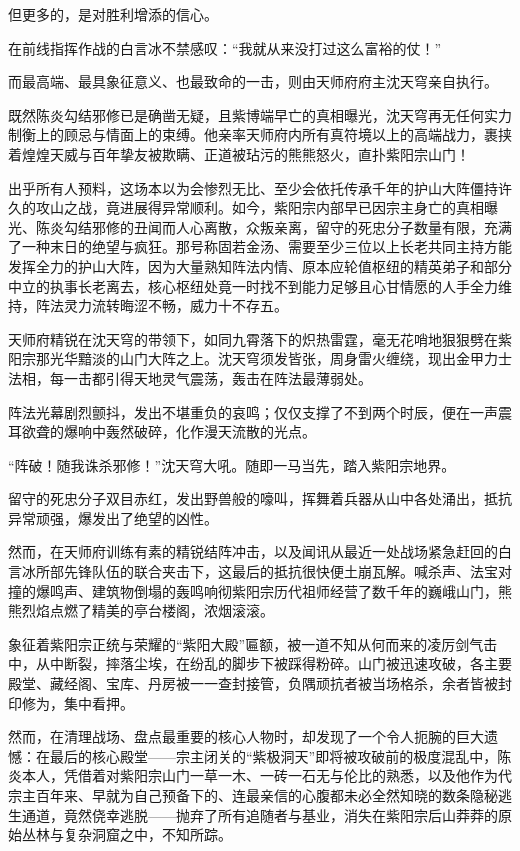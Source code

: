但更多的，是对胜利增添的信心。

在前线指挥作战的白言冰不禁感叹：“我就从来没打过这么富裕的仗！”

\vspace{2em}

而最高端、最具象征意义、也最致命的一击，则由天师府府主沈天穹亲自执行。

既然陈炎勾结邪修已是确凿无疑，且紫博端早亡的真相曝光，沈天穹再无任何实力制衡上的顾忌与情面上的束缚。他亲率天师府内所有真符境以上的高端战力，裹挟着煌煌天威与百年挚友被欺瞒、正道被玷污的熊熊怒火，直扑紫阳宗山门！

出乎所有人预料，这场本以为会惨烈无比、至少会依托传承千年的护山大阵僵持许久的攻山之战，竟进展得异常顺利。如今，紫阳宗内部早已因宗主身亡的真相曝光、陈炎勾结邪修的丑闻而人心离散，众叛亲离，留守的死忠分子数量有限，充满了一种末日的绝望与疯狂。那号称固若金汤、需要至少三位以上长老共同主持方能发挥全力的护山大阵，因为大量熟知阵法内情、原本应轮值枢纽的精英弟子和部分中立的执事长老离去，核心枢纽处竟一时找不到能力足够且心甘情愿的人手全力维持，阵法灵力流转晦涩不畅，威力十不存五。

天师府精锐在沈天穹的带领下，如同九霄落下的炽热雷霆，毫无花哨地狠狠劈在紫阳宗那光华黯淡的山门大阵之上。沈天穹须发皆张，周身雷火缠绕，现出金甲力士法相，每一击都引得天地灵气震荡，轰击在阵法最薄弱处。

阵法光幕剧烈颤抖，发出不堪重负的哀鸣；仅仅支撑了不到两个时辰，便在一声震耳欲聋的爆响中轰然破碎，化作漫天流散的光点。

“阵破！随我诛杀邪修！”沈天穹大吼。随即一马当先，踏入紫阳宗地界。

留守的死忠分子双目赤红，发出野兽般的嚎叫，挥舞着兵器从山中各处涌出，抵抗异常顽强，爆发出了绝望的凶性。

然而，在天师府训练有素的精锐结阵冲击，以及闻讯从最近一处战场紧急赶回的白言冰所部先锋队伍的联合夹击下，这最后的抵抗很快便土崩瓦解。喊杀声、法宝对撞的爆鸣声、建筑物倒塌的轰鸣响彻紫阳宗历代祖师经营了数千年的巍峨山门，熊熊烈焰点燃了精美的亭台楼阁，浓烟滚滚。

象征着紫阳宗正统与荣耀的“紫阳大殿”匾额，被一道不知从何而来的凌厉剑气击中，从中断裂，摔落尘埃，在纷乱的脚步下被踩得粉碎。山门被迅速攻破，各主要殿堂、藏经阁、宝库、丹房被一一查封接管，负隅顽抗者被当场格杀，余者皆被封印修为，集中看押。

然而，在清理战场、盘点最重要的核心人物时，却发现了一个令人扼腕的巨大遗憾：在最后的核心殿堂——宗主闭关的“紫极洞天”即将被攻破前的极度混乱中，陈炎本人，凭借着对紫阳宗山门一草一木、一砖一石无与伦比的熟悉，以及他作为代宗主百年来、早就为自己预备下的、连最亲信的心腹都未必全然知晓的数条隐秘逃生通道，竟然侥幸逃脱——抛弃了所有追随者与基业，消失在紫阳宗后山莽莽的原始丛林与复杂洞窟之中，不知所踪。

